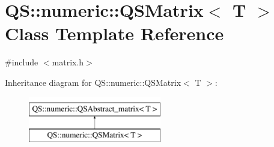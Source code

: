 \hypertarget{classQS_1_1numeric_1_1QSMatrix}{\section{Q\-S\-:\-:numeric\-:\-:Q\-S\-Matrix$<$ T $>$ Class Template Reference}
\label{classQS_1_1numeric_1_1QSMatrix}
}


{\ttfamily \#include $<$matrix.\-h$>$}

Inheritance diagram for Q\-S\-:\-:numeric\-:\-:Q\-S\-Matrix$<$ T $>$\-:\begin{figure}[H]
\begin{center}
\leavevmode
\includegraphics[height=2.000000cm]{classQS_1_1numeric_1_1QSMatrix}
\end{center}
\end{figure}
